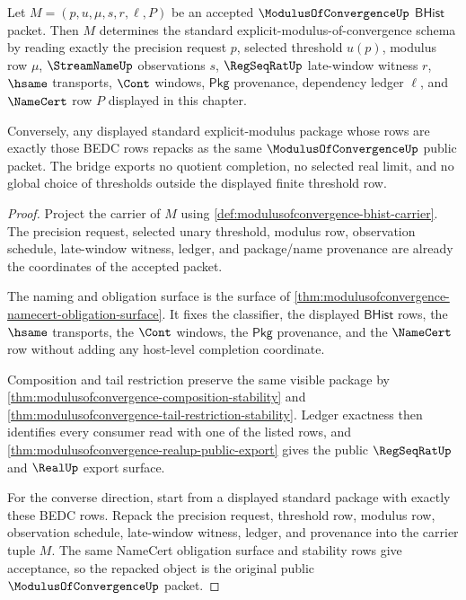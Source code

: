 \begin{theorem}\label{thm:modulusofconvergence-standard-bridge}
Let $M=(p,u,\mu,s,r,\ell,P)$ be an accepted
$\ModulusOfConvergenceUp$ $\mathsf{BHist}$ packet. Then $M$ determines the
standard explicit-modulus-of-convergence schema by reading exactly the
precision request $p$, selected threshold $u(p)$, modulus row $\mu$,
$\StreamNameUp$ observations $s$, $\RegSeqRatUp$ late-window witness $r$,
$\hsame$ transports, $\Cont$ windows, $\mathsf{Pkg}$ provenance, dependency
ledger $\ell$, and $\NameCert$ row $P$ displayed in this chapter.

Conversely, any displayed standard explicit-modulus package whose rows are
exactly those BEDC rows repacks as the same $\ModulusOfConvergenceUp$ public
packet. The bridge exports no quotient completion, no selected real limit, and
no global choice of thresholds outside the displayed finite threshold row.
\end{theorem}
\begin{proof}
Project the carrier of $M$ using
\autoref{def:modulusofconvergence-bhist-carrier}. The precision request,
selected unary threshold, modulus row, observation schedule, late-window
witness, ledger, and package/name provenance are already the coordinates of the
accepted packet.

The naming and obligation surface is the surface of
\autoref{thm:modulusofconvergence-namecert-obligation-surface}. It fixes the
classifier, the displayed $\mathsf{BHist}$ rows, the $\hsame$ transports, the
$\Cont$ windows, the $\mathsf{Pkg}$ provenance, and the $\NameCert$ row without
adding any host-level completion coordinate.

Composition and tail restriction preserve the same visible package by
\autoref{thm:modulusofconvergence-composition-stability} and
\autoref{thm:modulusofconvergence-tail-restriction-stability}. Ledger exactness
then identifies every consumer read with one of the listed rows, and
\autoref{thm:modulusofconvergence-realup-public-export} gives the public
$\RegSeqRatUp$ and $\RealUp$ export surface.

For the converse direction, start from a displayed standard package with
exactly these BEDC rows. Repack the precision request, threshold row, modulus
row, observation schedule, late-window witness, ledger, and provenance into the
carrier tuple $M$. The same NameCert obligation surface and stability rows give
acceptance, so the repacked object is the original public
$\ModulusOfConvergenceUp$ packet.
\end{proof}

